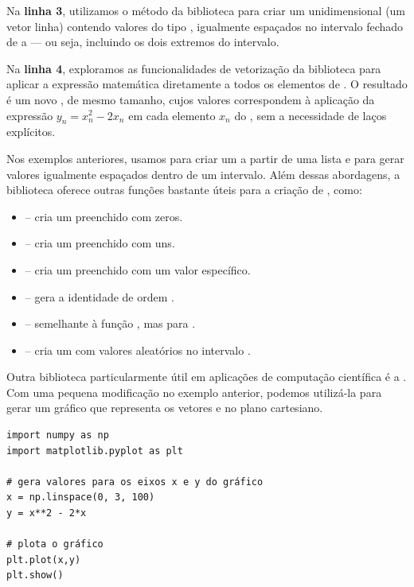 Na \textbf{linha 3}, utilizamos o método  da biblioteca  para criar um 
unidimensional (um vetor linha) contendo  valores do tipo , igualmente espaçados no intervalo fechado de  a
 --- ou seja, incluindo os dois extremos do intervalo.

Na \textbf{linha 4}, exploramos as funcionalidades de vetorização da biblioteca  para aplicar a
expressão matemática diretamente a todos os elementos de .
O resultado é um novo , de mesmo tamanho, cujos valores correspondem à aplicação da expressão
$y_n = x_n^2 - 2x_n$ em cada elemento $x_n$ do , sem a necessidade de laços explícitos.

Nos exemplos anteriores, usamos  para criar um  a partir de uma
lista e  para gerar valores igualmente espaçados dentro de um intervalo.
Além dessas abordagens, a biblioteca  oferece outras funções bastante úteis para a criação de
, como:
\begin{itemize}
\item []  -- cria um  preenchido com zeros.
\item []  -- cria um  preenchido com uns.
\item []  -- cria um  preenchido com um valor específico.
\item []  -- gera a  identidade de ordem .
\item []  -- semelhante à função , mas para .
\item []  -- cria um  com valores aleatórios no intervalo \inlcode{[0, 1)}.
\end{itemize}


Outra biblioteca particularmente útil em aplicações de computação científica é a .
Com uma pequena modificação no exemplo anterior, podemos utilizá-la para gerar um gráfico que representa os
vetores  e  no plano cartesiano.
\begin{verbatim}
import numpy as np
import matplotlib.pyplot as plt

# gera valores para os eixos x e y do gráfico
x = np.linspace(0, 3, 100)
y = x**2 - 2*x

# plota o gráfico
plt.plot(x,y)
plt.show()
\end{verbatim}

